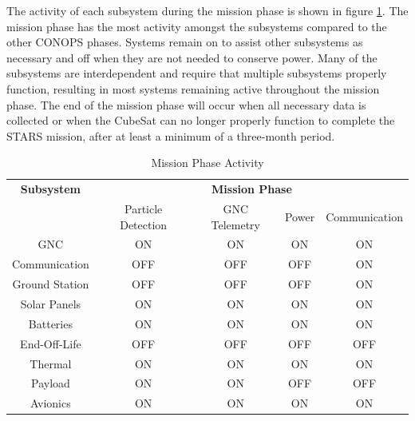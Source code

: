 The activity of each subsystem during the mission phase is shown in figure \ref{tab:on2}. The mission phase has the most activity amongst the subsystems compared to the other CONOPS phases. Systems remain on to assist other subsystems as necessary and off when they are not needed to conserve power. Many of the subsystems are interdependent and require that multiple subsystems properly function, resulting in most systems remaining active throughout the mission phase. The end of the mission phase will occur when all necessary data is collected or when the CubeSat can no longer properly function to complete the STARS mission, after at least a minimum of a three-month period.

\begin{table}[htbp]
  \centering
  \caption{Mission Phase Activity}
    \begin{tabular}{|c|c|c|c|c|}
    \hline 
    \textbf{Subsystem} & \multicolumn{4}{c|}{\textbf{Mission Phase }} \\
          & \multicolumn{1}{c}{Particle Detection } & \multicolumn{1}{c}{GNC Telemetry} & \multicolumn{1}{c}{Power} & Communication \\
    GNC   & \cellcolor[rgb]{ .573,  .816,  .314}ON & \cellcolor[rgb]{ .573,  .816,  .314}ON & \cellcolor[rgb]{ .573,  .816,  .314}ON & \cellcolor[rgb]{ .573,  .816,  .314}ON \\
 Communication & \cellcolor[rgb]{ .753,  0,  0}OFF & \cellcolor[rgb]{ .753,  0,  0}OFF & \cellcolor[rgb]{ .753,  0,  0}OFF & \cellcolor[rgb]{ .573,  .816,  .314}ON \\
   Ground Station & \cellcolor[rgb]{ .753,  0,  0}OFF & \cellcolor[rgb]{ .753,  0,  0}OFF & \cellcolor[rgb]{ .753,  0,  0}OFF & \cellcolor[rgb]{ .573,  .816,  .314}ON \\
   Solar Panels  & \cellcolor[rgb]{ .573,  .816,  .314}ON & \cellcolor[rgb]{ .573,  .816,  .314}ON & \cellcolor[rgb]{ .573,  .816,  .314}ON & \cellcolor[rgb]{ .573,  .816,  .314}ON \\
   Batteries  & \cellcolor[rgb]{ .573,  .816,  .314}ON & \cellcolor[rgb]{ .573,  .816,  .314}ON & \cellcolor[rgb]{ .573,  .816,  .314}ON & \cellcolor[rgb]{ .573,  .816,  .314}ON \\
   End-Off-Life & \cellcolor[rgb]{ .753,  0,  0}OFF & \cellcolor[rgb]{ .753,  0,  0}OFF & \cellcolor[rgb]{ .753,  0,  0}OFF & \cellcolor[rgb]{ .753,  0,  0}OFF \\
    Thermal  & \cellcolor[rgb]{ .573,  .816,  .314}ON & \cellcolor[rgb]{ .573,  .816,  .314}ON & \cellcolor[rgb]{ .573,  .816,  .314}ON & \cellcolor[rgb]{ .573,  .816,  .314}ON \\
   Payload & \cellcolor[rgb]{ .573,  .816,  .314}ON & \cellcolor[rgb]{ .573,  .816,  .314}ON & \cellcolor[rgb]{ .753,  0,  0}OFF & \cellcolor[rgb]{ .753,  0,  0}OFF \\
   Avionics & \cellcolor[rgb]{ .573,  .816,  .314}ON & \cellcolor[rgb]{ .573,  .816,  .314}ON & \cellcolor[rgb]{ .573,  .816,  .314}ON & \cellcolor[rgb]{ .573,  .816,  .314}ON \\
    \hline 
    \end{tabular}
  \label{tab:on2}
\end{table}

